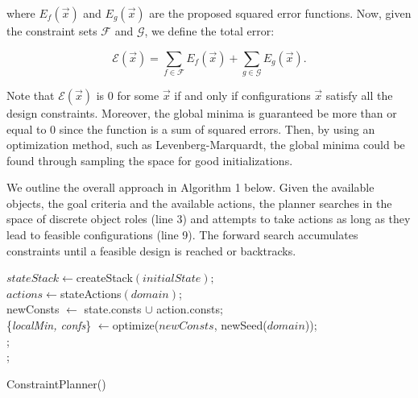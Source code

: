 \documentclass[runningheads,a4paper]{llncs}
\begin{document}
\noindent where $E_f(\vec{x})$ and $E_g(\vec{x})$ are the proposed squared error functions. Now,
given the constraint sets $\mathcal{F}$ and $\mathcal{G}$, we define the total error:

\begin{equation}
	\mathcal{E}(\vec{x}) = \sum\limits_{f \in \mathcal{F}} E_f(\vec{x}) + \sum\limits_{g \in \mathcal{G}} E_g(\vec{x}).
\end{equation}

\noindent Note that $\mathcal{E}(\vec{x})$ is 0 for
some $\vec{x}$ if and only if configurations $\vec{x}$ satisfy all the design
constraints. Moreover, the global minima is guaranteed be more than or equal
to 0 since the function is a sum of squared errors. Then, by using an optimization method, such as
Levenberg-Marquardt, the global minima could be found through sampling the space for good initializations.

We outline the overall approach in Algorithm 1 below. Given the available objects, the goal
criteria and the available actions, the planner searches in the space of discrete object roles
(line 3) and attempts to take actions as long as they lead to feasible configurations (line 9). The forward
search accumulates constraints until a feasible design is reached or backtracks. 

\begin{algorithm}[ht!]
  $stateStack \leftarrow $createStack$(initialState);$ \\
   {
    $actions \leftarrow $stateActions$(domain)$; \\
     {
       {
				newConsts $\leftarrow$ state.consts $\cup$ action.consts; \\
				 {
					\{\textit{localMin, confs}\} $\leftarrow $optimize($newConsts$, newSeed($domain$)); \\
					 {
						 ; \\
					}
				}
			}
		}
  }
  \Return{$\emptyset$}; 
  \caption{ConstraintPlanner()}
\end{algorithm}
\end{document}
